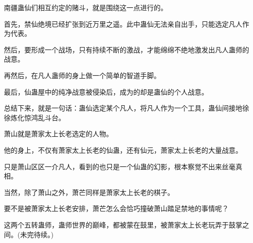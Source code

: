 \begin{this_body}
南疆蛊仙们相互约定的赌斗，就是围绕这一点进行的。

首先，禁仙绝境已经扩张到近万里之遥。此中蛊仙无法亲自出手，只能选定凡人作为代表。

然后，要形成一个战场，只有持续不断的激战，才能绵绵不绝地激发出凡人蛊师的战意。

再然后，在凡人蛊师的身上做一个简单的智道手脚。

最后，仙蛊屋中的纯净战意被侵染后，成为的却是蛊仙的个人战意。

总结下来，就是一句话：蛊仙选定某个凡人，将凡人作为一个工具，蛊仙间接地徐徐炼化惊鸿乱斗台。

萧山就是萧家太上长老选定的人物。

他的身上，不仅有萧家太上长老的仙蛊，还有仙元，萧家太上长老的大量战意。

只是萧山区区一介凡人，看到的也只是一个仙蛊的幻影，根本察觉不出来丝毫真相。

当然，除了萧山之外，萧芒同样是萧家太上长老的棋子。

要不是被萧家太上长老安排，萧芒怎么会恰巧撞破萧山踏足禁地的事情呢？

这两个五转蛊师，蛊师世界的巅峰，都被蒙在鼓里，被萧家太上长老玩弄于鼓掌之间。(未完待续。)

\end{this_body}

